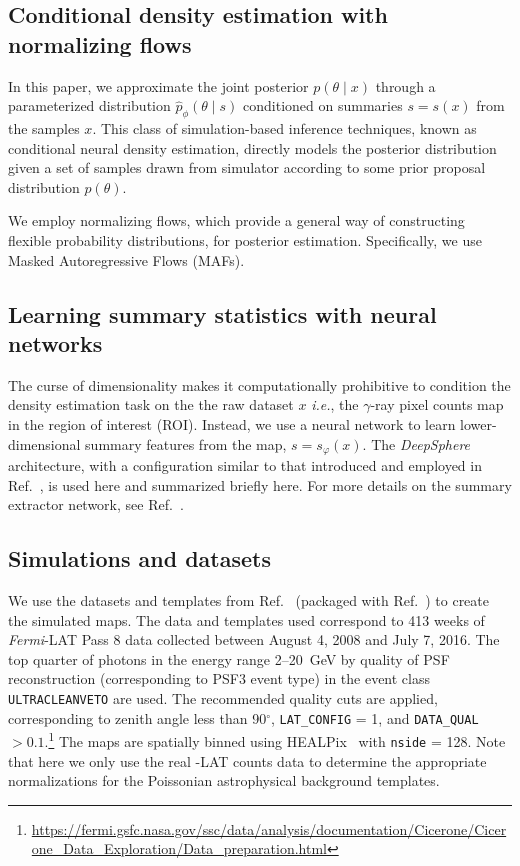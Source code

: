 \documentclass[prd,aps,10pt,nofootinbib,twocolumn,superscriptaddress,preprintnumbers,balancelastpage,longbibliography]{revtex4-1}
\begin{document}
\subsection{Conditional density estimation with normalizing flows}

In this paper, we approximate the joint posterior $p(\theta\mid x)$ through a parameterized distribution $\hat p_\phi(\theta\mid s)$ conditioned on summaries $s=s(x)$ from the samples $x$. This class of simulation-based inference techniques, known as conditional neural density estimation, directly models the posterior distribution given a set of samples drawn from simulator according to some prior proposal distribution $p(\theta)$.

We employ normalizing flows, which provide a general way of constructing flexible probability distributions, for posterior estimation. Specifically, we use Masked Autoregressive Flows (MAFs).

\subsection{Learning summary statistics with neural networks}

The curse of dimensionality makes it computationally prohibitive to condition the density estimation task on the the raw dataset $x$ \emph{i.e.}, the $\gamma$-ray pixel counts map in the region of interest (ROI). Instead, we use a neural network to learn lower-dimensional summary features from the map, $s = s_\varphi(x)$. The \emph{DeepSphere}~\cite{defferrard2020deepsphere,Perraudin:2018rbt} architecture, with a configuration similar to that introduced and employed in Ref.~\cite{List:2020mzd}, is used here and summarized briefly here. For more details on the summary extractor network, see Ref.~\cite{List:2020mzd}.

\subsection{Simulations and datasets}

We use the datasets and templates from Ref.~\cite{rodd_nicholas_safdi_siddharth_2016} (packaged with Ref.~\cite{Mishra-Sharma:2016gis}) to create the simulated maps. The data and templates used correspond to 413 weeks of \emph{Fermi}-LAT Pass 8 data collected between August 4, 2008 and July 7, 2016. The top quarter of photons in the energy range 2--20~GeV by quality of PSF reconstruction (corresponding to PSF3 event type) in the event class \texttt{ULTRACLEANVETO} are used. The recommended quality cuts are applied, corresponding to zenith angle less than 90$^\circ$, \texttt{LAT\_CONFIG} = 1, and \texttt{DATA\_QUAL} $> 0.1$.\footnote{\url{https://fermi.gsfc.nasa.gov/ssc/data/analysis/documentation/Cicerone/Cicerone_Data_Exploration/Data_preparation.html}} The maps are spatially binned using HEALPix~\cite{Gorski:2004by} with \texttt{nside} = 128. Note that here we only use the real \Fermi-LAT counts data to determine the appropriate normalizations for the Poissonian astrophysical background templates.
\end{document}
